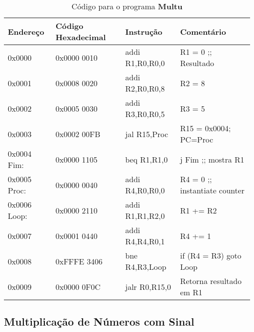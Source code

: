 \documentclass[12pt]{article}
\begin{document}
\begin{table}[H]
    \centering
    \caption{Código para o programa \textbf{Multu}}
    \begin{tabular}{|l|l|l|l|}\hline
        \textbf{Endereço} & \textbf{Código Hexadecimal} & \textbf{Instrução} & \textbf{Comentário} \\\hline
        0x0000       & 0x0000 0010 & addi R1,R0,R0,0 & R1 = 0 ;; Resultado           \\\hline
        0x0001       & 0x0008 0020 & addi R2,R0,R0,8 & R2 = 8                        \\\hline
        0x0002       & 0x0005 0030 & addi R3,R0,R0,5 & R3 = 5                        \\\hline
        0x0003       & 0x0002 00FB & jal R15,Proc    & R15 = 0x0004; PC=Proc         \\\hline
        0x0004 Fim:  & 0x0000 1105 & beq R1,R1,0     & j Fim ;; mostra R1            \\\hline
        0x0005 Proc: & 0x0000 0040 & addi R4,R0,R0,0 & R4 = 0 ;; instantiate counter \\\hline
        0x0006 Loop: & 0x0000 2110 & addi R1,R1,R2,0 & R1 += R2                      \\\hline
        0x0007       & 0x0001 0440 & addi R4,R4,R0,1 & R4 += 1                       \\\hline
        0x0008       & 0xFFFE 3406 & bne  R4,R3,Loop & if (R4 \!= R3) goto Loop      \\\hline
        0x0009       & 0x0000 0F0C & jalr R0,R15,0   & Retorna resultado em R1       \\\hline
    \end{tabular}\label{tab:programs:multu}
\end{table}

\subsection{Multiplicação de Números com Sinal}\label{sec:programs:mult}
\end{document}
